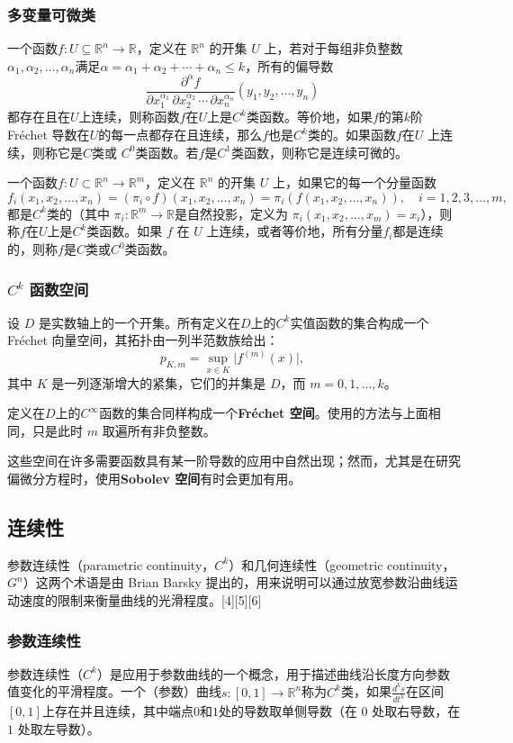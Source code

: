 \subsubsection{多变量可微类}
一个函数$f: U \subseteq \mathbb{R}^n \to \mathbb{R}$，定义在 $\mathbb{R}^n$ 的开集 $U$ 上，若对于每组非负整数$\alpha_1, \alpha_2, \ldots, \alpha_n$满足$\alpha = \alpha_1 + \alpha_2 + \cdots + \alpha_n \le k$，所有的偏导数
$$
\frac{\partial^\alpha f}{\partial x_1^{\alpha_1}\,\partial x_2^{\alpha_2}\,\cdots\,\partial x_n^{\alpha_n}}(y_1, y_2, \ldots, y_n)~
$$
都存在且在$U$上连续，则称函数$f$在$U$上是$C^k$类函数。等价地，如果$f$的第$k$阶 Fréchet 导数在$U$的每一点都存在且连续，那么$f$也是$C^k$类的。如果函数$f$在$U$ 上连续，则称它是$C$类或 $C^0$类函数。若$f$是$C^1$类函数，则称它是连续可微的。

一个函数$f: U \subset \mathbb{R}^n \to \mathbb{R}^m$，定义在 $\mathbb{R}^n$ 的开集 $U$ 上，如果它的每一个分量函数
$$
f_i(x_1, x_2, \ldots, x_n)
= (\pi_i \circ f)(x_1, x_2, \ldots, x_n)
= \pi_i(f(x_1, x_2, \ldots, x_n)), \quad i=1,2,3,\ldots,m,~
$$
都是$C^k$类的（其中 $\pi_i: \mathbb{R}^m \to \mathbb{R}$是自然投影，定义为 $\pi_i(x_1, x_2, \ldots, x_m) = x_i$），则称$f$在$U$上是$C^k$类函数。如果 $f$ 在 $U$ 上连续，或者等价地，所有分量$f_i$都是连续的，则称$f$是$C$类或$C^0$类函数。
\subsubsection{$C^k$ 函数空间}
设 $D$ 是实数轴上的一个开集。所有定义在$D$上的$C^k$实值函数的集合构成一个 Fréchet 向量空间，其拓扑由一列半范数族给出：
$$
p_{K,m} = \sup_{x \in K} \big| f^{(m)}(x) \big|,~
$$
其中 $K$ 是一列逐渐增大的紧集，它们的并集是 $D$，而 $m = 0, 1, \dots, k$。

定义在$D$上的$C^\infty$函数的集合同样构成一个\textbf{Fréchet 空间}。使用的方法与上面相同，只是此时 $m$ 取遍所有非负整数。

这些空间在许多需要函数具有某一阶导数的应用中自然出现；然而，尤其是在研究偏微分方程时，使用\textbf{Sobolev 空间}有时会更加有用。
\subsection{连续性}
参数连续性（parametric continuity，$C^k$）和几何连续性（geometric continuity，$G^n$）这两个术语是由 Brian Barsky 提出的，用来说明可以通过放宽参数沿曲线运动速度的限制来衡量曲线的光滑程度。[4][5][6]
\subsubsection{参数连续性}
参数连续性（$C^k$）是应用于参数曲线的一个概念，用于描述曲线沿长度方向参数值变化的平滑程度。一个（参数）曲线$s: [0,1] \to \mathbb{R}^n$称为$C^k$类，如果$\frac{d^k s}{dt^k}$在区间$[0,1]$上存在并且连续，其中端点$0$和$1$处的导数取单侧导数（在 $0$ 处取右导数，在 $1$ 处取左导数）。

